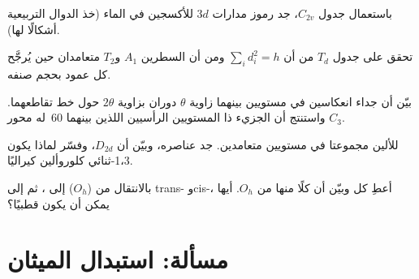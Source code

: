 \begin{exercise}[$\star\star$]\label{exo:b3:point-groups:8}
باستعمال جدول $C_{2v}$، جد رموز مدارات $3d$ للأكسجين في الماء
(خذ الدوال التربيعية أشكالًا لها).
\end{exercise}

\begin{exercise}[$\star\star$]\label{exo:b3:point-groups:9}
تحقق على جدول $T_d$ من أن $\sum_id_i^2 = h$ ومن أن السطرين $A_1$ و$T_2$
متعامدان حين يُرجَّح كل عمود بحجم صنفه.
\end{exercise}

\begin{exercise}[$\star\star\star$]\label{exo:b3:point-groups:10}
بيّن أن جداء انعكاسين في مستويين بينهما زاوية
$\theta$ دوران بزاوية $2\theta$ حول خط تقاطعهما. واستنتج أن
الجزيء ذا المستويين الرأسيين اللذين بينهما 60\textdegree\ له محور $C_3$.
\end{exercise}

\begin{exercise}[$\star\star\star$]\label{exo:b3:point-groups:11}
للألين  مجموعتا  في مستويين متعامدين. جد
عناصره، وبيّن أن  $D_{2d}$، وفسّر لماذا يكون
1،3-ثنائي كلوروألين  كيراليًا.
\end{exercise}

\begin{exercise}[$\star\star\star$]\label{exo:b3:point-groups:12}
بالانتقال من  ($O_h$) إلى ، ثم إلى trans- 
وcis-، أعطِ كل  وبيّن أن كلًا منها  من
$O_h$. أيها يمكن أن يكون قطبيًا؟
\end{exercise}

\section{مسألة: استبدال الميثان}


